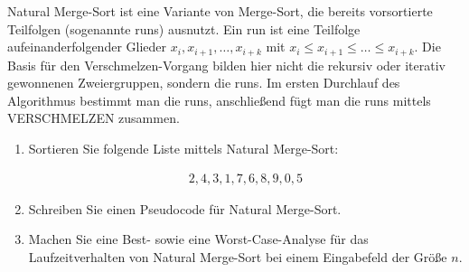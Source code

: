 
\begin{exercise}

Natural Merge-Sort ist eine Variante von Merge-Sort, die bereits vorsortierte Teilfolgen (sogenannte runs) ausnutzt. Ein run ist eine Teilfolge aufeinanderfolgender Glieder $x_i, x_{i+1}, \dots, x_{i+k}$ mit $x_i \leq x_{i+1} \leq \dots \leq x_{i+k}$.
Die Basis für den Verschmelzen-Vorgang bilden hier nicht die rekursiv oder iterativ gewonnenen Zweiergruppen, sondern die runs.
Im ersten Durchlauf des Algorithmus bestimmt man die runs, anschließend fügt man die runs mittels VERSCHMELZEN zusammen.

\begin{enumerate}[label = (\alph*)]

  \item Sortieren Sie folgende Liste mittels Natural Merge-Sort:

  \begin{align}
    2, 4, 3, 1, 7, 6, 8, 9, 0, 5
  \end{align}

  \item Schreiben Sie einen Pseudocode für Natural Merge-Sort.

  \item Machen Sie eine Best- sowie eine Worst-Case-Analyse für das Laufzeitverhalten von Natural Merge-Sort bei einem Eingabefeld der Größe $n$.

\end{enumerate}

\end{exercise}


